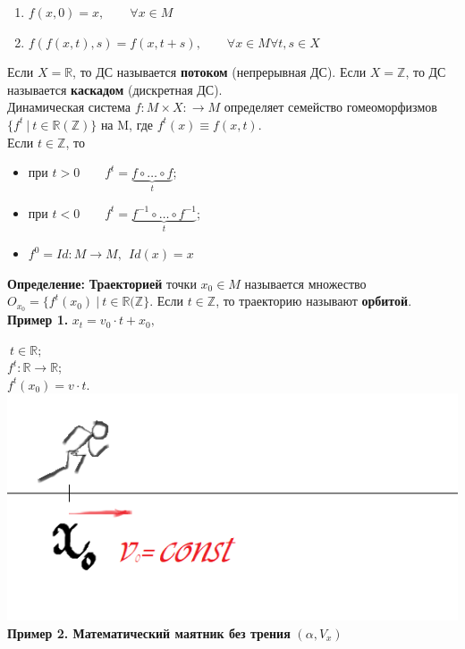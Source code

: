 \documentclass[12pt,a4paper]{article}
\begin{document}
\begin{enumerate}
\item $f(x,0) = x,\qquad \forall x \in M$
\item $f(f(x,t),s) = f(x, t+s),\qquad \forall x \in M \forall t,s \in X$ 
\end{enumerate} 

Если $X = \mathbb{R}$, то ДС называется \textbf{потоком} (непрерывная ДС).
Если $X = \mathbb{Z}$, то ДС называется \textbf{каскадом} (дискретная ДС).\\

Динамическая система $f:M\times X: \rightarrow M$ определяет семейство гомеоморфизмов $\{ f^t~|~ t \in \mathbb{R}(\mathbb{Z}) \}$ на M, где $f^t(x) \equiv f(x,t)$. \\

Если $t \in \mathbb{Z}$, то
\begin{itemize}
\item при $t > 0 \qquad f^t = \underbrace{f \circ \ldots \circ f}_t$;
\item при $t < 0 \qquad f^t = \underbrace{f^{-1} \circ \ldots \circ f^{-1}}_t$;
\item $f^0 = Id:M \rightarrow M, ~~ Id(x) = x$
\end{itemize}

\textbf{\large{Определение:}} \textbf{Траекторией} точки $x_0 \in M$ называется множество $O_{x_0} = \{f^t(x_0)~|~ t \in \mathbb{R(\mathbb{Z}} \}$. Если $t \in \mathbb{Z}$, то траекторию называют \textbf{орбитой}.\\

\textbf{Пример 1.} 
$x_t = v_0\cdot t + x_0,$

$~ t\in \mathbb{R};$\\

$f^t:\mathbb{R} \rightarrow \mathbb{R};$\\

$f^t(x_0) = v\cdot t.$
\includegraphics[scale = 0.45]{runner.png} 
\newpage \textbf{Пример 2. Математический маятник без трения} 
$ (\alpha ,V_x)$
\end{document}
